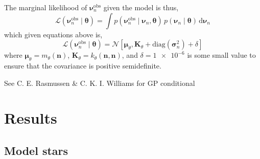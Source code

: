 \documentclass[linenumbers,modern]{aastex631dm}
\newcommand{\npred}{n_{\star}}
\newcommand{\dd}{\mathrm{d}}
\begin{document}
The marginal likelihood of \(\bm\nu^\mathrm{obs}_n\) given the model is thus,
%
\begin{equation}
    \mathcal{L}(\bm\nu^\mathrm{obs}_n \mid \bm\theta)
    = \int p(\bm\nu^\mathrm{obs}_n \mid \bm \nu_n, \bm\theta)
    \, p(\bm \nu_n \mid \bm\theta) \, \dd \bm \nu_n
\end{equation}
%
which given equations above is,
%
\begin{equation}
    \mathcal{L}(\bm\nu^\mathrm{obs}_n \mid \bm\theta) = \mathcal{N}\left[ 
        \bm\mu_\theta, \bm K_\theta
        + \mathrm{diag}(\bm\sigma_n^2) + \delta
    \right]
\end{equation}
%
where \(\bm\mu_\theta = m_\theta(\bm n)\), \(\bm K_\theta = k_\theta(\bm n, \bm n)\), and
\(\delta = \num{1e-6}\) is some small value to ensure that the covariance is
positive semidefinite.

See C. E. Rasmussen \& C. K. I. Williams for GP conditional
%


\section{Results}\label{sec:results}




\subsection{Model stars}\label{sec:model-stars}
\end{document}
